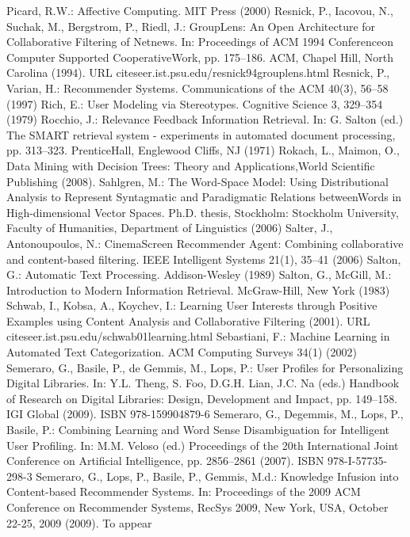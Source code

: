 \begin{thebibliography}{110}
Picard, R.W.: Affective Computing. MIT Press (2000)
Resnick, P., Iacovou, N., Suchak, M., Bergstrom, P., Riedl, J.: GroupLens: An Open Architecture for Collaborative Filtering of Netnews. In: Proceedings of ACM 1994 Conferenceon Computer Supported CooperativeWork, pp. 175–186. ACM, Chapel Hill, North Carolina (1994). URL citeseer.ist.psu.edu/resnick94grouplens.html
Resnick, P., Varian, H.: Recommender Systems. Communications of the ACM 40(3), 56–58 (1997)
Rich, E.: User Modeling via Stereotypes. Cognitive Science 3, 329–354 (1979)
Rocchio, J.: Relevance Feedback Information Retrieval. In: G. Salton (ed.) The SMART retrieval system - experiments in automated document processing, pp. 313–323. PrenticeHall, Englewood Cliffs, NJ (1971)
Rokach, L., Maimon, O., Data Mining with Decision Trees: Theory and Applications,World Scientific Publishing (2008).
Sahlgren, M.: The Word-Space Model: Using Distributional Analysis to Represent Syntagmatic and Paradigmatic Relations betweenWords in High-dimensional Vector Spaces. Ph.D. thesis, Stockholm: Stockholm University, Faculty of Humanities, Department of Linguistics (2006)
Salter, J., Antonoupoulos, N.: CinemaScreen Recommender Agent: Combining collaborative and content-based filtering. IEEE Intelligent Systems 21(1), 35–41 (2006)
Salton, G.: Automatic Text Processing. Addison-Wesley (1989)
Salton, G., McGill, M.: Introduction to Modern Information Retrieval. McGraw-Hill, New York (1983)
Schwab, I., Kobsa, A., Koychev, I.: Learning User Interests through Positive Examples using Content Analysis and Collaborative Filtering (2001). URL citeseer.ist.psu.edu/schwab01learning.html
Sebastiani, F.: Machine Learning in Automated Text Categorization. ACM Computing Surveys 34(1) (2002)
Semeraro, G., Basile, P., de Gemmis, M., Lops, P.: User Profiles for Personalizing Digital Libraries. In: Y.L. Theng, S. Foo, D.G.H. Lian, J.C. Na (eds.) Handbook of Research on Digital Libraries: Design, Development and Impact, pp. 149–158. IGI Global (2009). ISBN 978-159904879-6
Semeraro, G., Degemmis, M., Lops, P., Basile, P.: Combining Learning and Word Sense Disambiguation for Intelligent User Profiling. In: M.M. Veloso (ed.) Proceedings of the 20th International Joint Conference on Artificial Intelligence, pp. 2856–2861 (2007). ISBN 978-I-57735-298-3
Semeraro, G., Lops, P., Basile, P., Gemmis, M.d.: Knowledge Infusion into Content-based Recommender Systems. In: Proceedings of the 2009 ACM Conference on Recommender Systems, RecSys 2009, New York, USA, October 22-25, 2009 (2009). To appear

\end{thebibliography}
